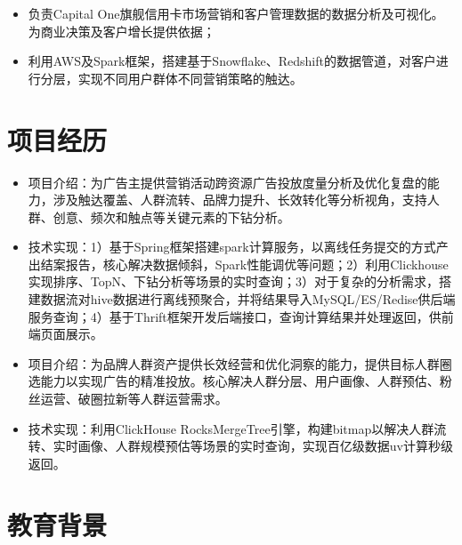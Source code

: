 \documentclass{resume}
\begin{document}
\begin{itemize}
  \item 负责Capital One旗舰信用卡市场营销和客户管理数据的数据分析及可视化。为商业决策及客户增长提供依据；
  \item 利用AWS及Spark框架，搭建基于Snowflake、Redshift的数据管道，对客户进行分层，实现不同用户群体不同营销策略的触达。
\end{itemize}

\section{项目经历}
\begin{itemize}
  \item 项目介绍：为广告主提供营销活动跨资源广告投放度量分析及优化复盘的能力，涉及触达覆盖、人群流转、品牌力提升、长效转化等分析视角，支持人群、创意、频次和触点等关键元素的下钻分析。
  \item 技术实现：1）基于Spring框架搭建spark计算服务，以离线任务提交的方式产出结案报告，核心解决数据倾斜，Spark性能调优等问题；2）利用Clickhouse实现排序、TopN、下钻分析等场景的实时查询；3）对于复杂的分析需求，搭建数据流对hive数据进行离线预聚合，并将结果导入MySQL/ES/Redise供后端服务查询；4）基于Thrift框架开发后端接口，查询计算结果并处理返回，供前端页面展示。
\end{itemize}

\begin{itemize}
  \item 项目介绍：为品牌人群资产提供长效经营和优化洞察的能力，提供目标人群圈选能力以实现广告的精准投放。核心解决人群分层、用户画像、人群预估、粉丝运营、破圈拉新等人群运营需求。
  \item 技术实现：利用ClickHouse RocksMergeTree引擎，构建bitmap以解决人群流转、实时画像、人群规模预估等场景的实时查询，实现百亿级数据uv计算秒级返回。
\end{itemize}

\section{教育背景}
\end{document}
